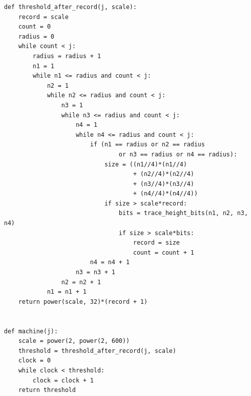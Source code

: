 \begin{verbatim}
def threshold_after_record(j, scale):
    record = scale
    count = 0
    radius = 0
    while count < j:
        radius = radius + 1
        n1 = 1
        while n1 <= radius and count < j:
            n2 = 1
            while n2 <= radius and count < j:
                n3 = 1
                while n3 <= radius and count < j:
                    n4 = 1
                    while n4 <= radius and count < j:
                        if (n1 == radius or n2 == radius
                                or n3 == radius or n4 == radius):
                            size = ((n1//4)*(n1//4)
                                    + (n2//4)*(n2//4)
                                    + (n3//4)*(n3//4)
                                    + (n4//4)*(n4//4))
                            if size > scale*record:
                                bits = trace_height_bits(n1, n2, n3, n4)
                                if size > scale*bits:
                                    record = size
                                    count = count + 1
                        n4 = n4 + 1
                    n3 = n3 + 1
                n2 = n2 + 1
            n1 = n1 + 1
    return power(scale, 32)*(record + 1)


def machine(j):
    scale = power(2, power(2, 600))
    threshold = threshold_after_record(j, scale)
    clock = 0
    while clock < threshold:
        clock = clock + 1
    return threshold
\end{verbatim}
\endgroup

